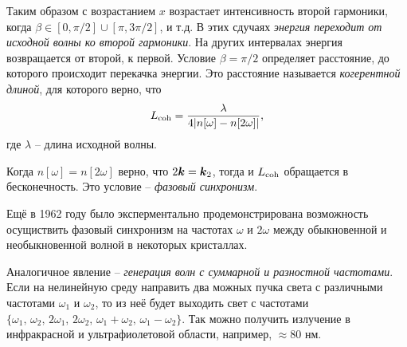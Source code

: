 Таким образом с возрастанием $x$ возрастает интенсивность второй гармоники, когда $\beta \in [0, \pi/2]\cup[\pi, 3\pi/2]$, и т.д. В этих сдучаях \textit{энергия переходит от исходной волны ко второй гармоники}. На других интервалах энергия возвращается от второй, к первой. Условие $\beta=\pi/2$ определяет расстояние, до которого происходит перекачка энергии. Это расстояние называется \textit{когерентной длиной}, для которого верно, что
\begin{equation*}
    L_{\textnormal{coh}} = \frac{\lambda}{4|n[\omega]-n[2\omega]|},
\end{equation*}
где $\lambda$ -- длина исходной волны. 

Когда $n[\omega]=n[2\omega]$ верно, что $2 \mbox{\boldmath $k$} = \mbox{\boldmath $k$}_2$, тогда и $L_{\textnormal{coh}}$ обращается в бесконечность. Это условие -- \textit{фазовый синхронизм}. 


Ещё в 1962 году было эксперментально продемонстрирована возможность осущиствить фазовый синхронизм на частотах $\omega$ и $2 \omega$ между обыкновенной и необыкновенной волной в некоторых кристаллах. 


Аналогичное явление -- \textit{генерация волн с суммарной и разностной частотами}. Если на нелинейную среду направить два можных пучка света с различными частотами $\omega_1$ и $\omega_2$, то из неё будет выходить свет с частотами $\{\omega_1,\, \omega_2,\, 2 \omega_1,\, 2 \omega_2,\, \omega_1+\omega_2,\, \omega_1-\omega_2\}$. Так можно получить излучение в инфракрасной и ультрафиолетовой области, например, $\approx 80$ нм. 